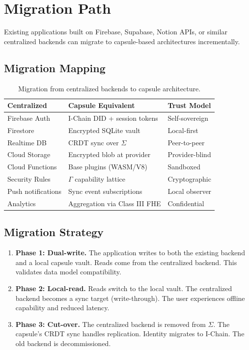 \section{Migration Path}
\label{sec:migration}

Existing applications built on Firebase, Supabase, Notion APIs, or similar
centralized backends can migrate to capsule-based architectures incrementally.

\subsection{Migration Mapping}

\begin{table}[H]
\centering
\caption{Migration from centralized backends to capsule architecture.}
\label{tab:migration}
\begin{tabular}{@{}lll@{}}
\toprule
\textbf{Centralized} & \textbf{Capsule Equivalent} & \textbf{Trust Model} \\
\midrule
Firebase Auth & I-Chain DID + session tokens & Self-sovereign \\
Firestore & Encrypted SQLite vault & Local-first \\
Realtime DB & CRDT sync over $\Sigma$ & Peer-to-peer \\
Cloud Storage & Encrypted blob at provider & Provider-blind \\
Cloud Functions & Base plugins (WASM/V8) & Sandboxed \\
Security Rules & $\Gamma$ capability lattice & Cryptographic \\
Push notifications & Sync event subscriptions & Local observer \\
Analytics & Aggregation via Class III FHE & Confidential \\
\bottomrule
\end{tabular}
\end{table}

\subsection{Migration Strategy}

\begin{enumerate}[nosep]
  \item \textbf{Phase 1: Dual-write.} The application writes to both the
        existing backend and a local capsule vault. Reads come from the
        centralized backend. This validates data model compatibility.
  \item \textbf{Phase 2: Local-read.} Reads switch to the local vault.
        The centralized backend becomes a sync target (write-through).
        The user experiences offline capability and reduced latency.
  \item \textbf{Phase 3: Cut-over.} The centralized backend is removed from
        $\Sigma$. The capsule's CRDT sync handles replication. Identity
        migrates to I-Chain. The old backend is decommissioned.
\end{enumerate}

